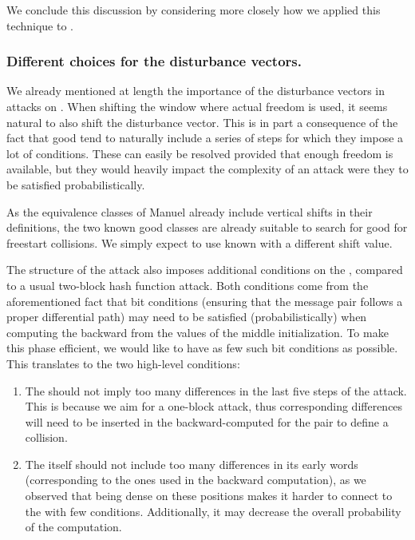 We conclude this discussion by considering more closely how we applied this technique to \shaone.

\subsubsection{Different choices for the disturbance vectors.}
We already mentioned at length the importance of the disturbance vectors in attacks on \shaone.
When shifting the window where actual freedom is used, it seems natural to also shift the disturbance vector.
This is in part a consequence of the fact that good \dvs tend to naturally include a series of steps for which they impose a lot of conditions. These can easily be resolved provided that
enough freedom is available, but they would heavily impact the complexity of an attack were they to be satisfied probabilistically.

As the equivalence classes of Manuel already include vertical shifts in their definitions, the two known good classes are already suitable to search for good \dvs for freestart collisions.
We simply expect to use known \dvs with a different shift value.

\medskip

The structure of the attack also imposes additional conditions on the \dv, compared to a usual two-block hash function attack. Both conditions come from the aforementioned fact that bit conditions
(ensuring that the message pair follows a proper differential path)
may need to be satisfied (probabilistically) when computing the \iv backward from the values of the middle initialization. To make this phase efficient, we would like to have as few such
bit conditions as possible. This translates to the two high-level conditions:
\begin{enumerate}
\item The \dv should not imply too many differences in the last five steps of the attack. This is because we aim for a one-block attack, thus corresponding differences will need to be inserted in the
backward-computed \iv for the pair to define a collision.
\item The \dv itself should not include too many differences in its early words (corresponding to the ones used in the backward computation), as we observed that being dense on these positions makes
it harder to connect to the \iv with few conditions. Additionally, it may decrease the overall probability of the computation.
\end{enumerate}

